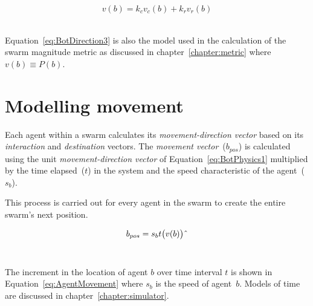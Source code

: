 \begin{center}
\begin{equation}
\label{eq:BotDirection3}
v(b) =‎ k_cv_c(b) + k_rv_r(b)
\end{equation}‎
\end{center}

Equation~\ref{eq:BotDirection3} is also the model used in the calculation of the swarm magnitude metric as discussed in chapter~\ref{chapter:metric} where $v(b) \equiv P(b)$.

\section{Modelling movement}\label{sec:Movement1}
Each agent within a swarm calculates its \textit{movement-direction vector} based on its \textit{interaction} and \textit{destination} vectors. The \textit{movement vector}~($b_{pos}$) is calculated using the unit \textit{movement-direction vector} of Equation~\ref{eq:BotPhysics1} multiplied by the time elapsed~($t$) in the system and the speed characteristic of the agent~($s_b$).

This process is carried out for every agent in the swarm to create the entire swarm's next position.

\begin{center}
\begin{equation}
\label{eq:AgentMovement}
b_{pos}=s_{b}t\big(v(b)\big)\string^ 
\end{equation}‎
\end{center}

The increment in the location of agent $b$ over time interval $t$ is shown in Equation~\ref{eq:AgentMovement} where $s_b$ is the speed of agent~$b$. Models of time are discussed in chapter~\ref{chapter:simulator}. 




